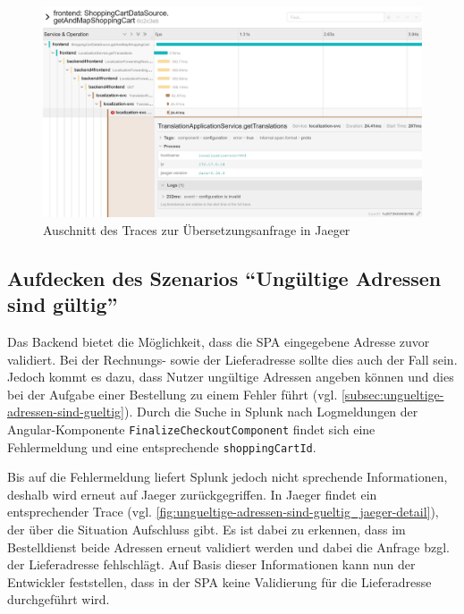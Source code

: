 \begin{figure}[H]
	\centering
	\includegraphics[width=1.00\linewidth]{img/05_ergebnis/keine-uebersetzungen_jaeger_detail.png}
	\caption{Auschnitt des Traces zur Übersetzungsanfrage in Jaeger}
	\label{fig:keine-uebersetzungen_jaeger_detail}
\end{figure}

\subsection{Aufdecken des Szenarios \enquote{Ungültige Adressen sind gültig}}

Das Backend bietet die Möglichkeit, dass die SPA eingegebene Adresse zuvor validiert. Bei der Rechnungs- sowie der Lieferadresse sollte dies auch der Fall sein. Jedoch kommt es dazu, dass Nutzer ungültige Adressen angeben können und dies bei der Aufgabe einer Bestellung zu einem Fehler führt (vgl. \autoref{subsec:ungueltige-adressen-sind-gueltig}). Durch die Suche in Splunk nach Logmeldungen der Angular-Komponente \texttt{Finalize\-Checkout\-Component} findet sich eine Fehlermeldung und eine entsprechende \texttt{shopping\-Cart\-Id}.

Bis auf die Fehlermeldung liefert Splunk jedoch nicht sprechende Informationen, deshalb wird erneut auf Jaeger zurückgegriffen. In Jaeger findet ein entsprechender Trace (vgl. \autoref{fig:ungueltige-adressen-sind-gueltig_jaeger-detail}), der über die Situation Aufschluss gibt. Es ist dabei zu erkennen, dass im Bestelldienst beide Adressen erneut validiert werden und dabei die Anfrage bzgl. der Lieferadresse fehlschlägt. Auf Basis dieser Informationen kann nun der Entwickler feststellen, dass in der SPA keine Validierung für die Lieferadresse durchgeführt wird.

